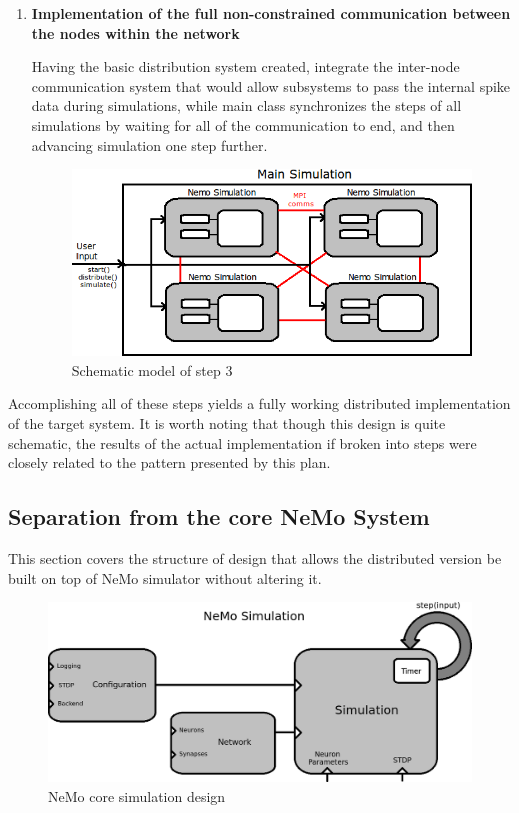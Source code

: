 \begin{enumerate}
\item{\textbf{Implementation of the full non-constrained communication between the nodes within the network}}

Having the basic distribution system created, integrate the inter-node communication system that would allow subsystems to pass the internal spike data during simulations, while main class synchronizes the steps of all simulations by waiting for all of the communication to end, and then advancing simulation one step further.

\begin{figure}[h!]
\begin{center}
\includegraphics[scale = 0.7]{images/design_stage_3.png}
\end{center}
\caption{Schematic model of step 3}
\end{figure}

\end{enumerate}

Accomplishing all of these steps yields a fully working distributed implementation of the target system. It is worth noting that though this design is quite schematic, the results of the actual implementation if broken into steps were closely related to the pattern presented by this plan.

\subsection{Separation from the core NeMo System}

This section covers the structure of design that allows the distributed version be built on top of NeMo simulator without altering it.

\begin{figure}[h!]
\begin{center}
\includegraphics[scale = 0.4]{images/core_simulation.png}
\end{center}
\caption{NeMo core simulation design}
\end{figure}

